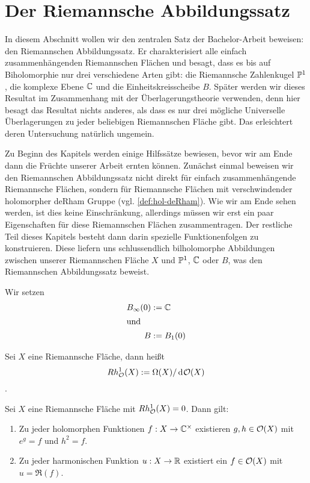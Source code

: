 \section{Der Riemannsche Abbildungssatz}
\label{sec:RMT}

In diesem Abschnitt wollen wir den zentralen Satz der Bachelor-Arbeit
beweisen: den Riemannschen Abbildungssatz. Er charakterisiert alle
einfach zusammenhängenden Riemannschen Flächen und besagt,
dass es bis auf Biholomorphie nur drei verschiedene Arten gibt: die
Riemannsche Zahlenkugel $\P^1$, die komplexe Ebene $\C$
und die Einheitskreisscheibe $B$.
Später werden wir dieses Resultat im Zusammenhang mit der
Überlagerungstheorie verwenden, denn hier besagt das Resultat nichts
anderes, als dass es nur drei mögliche Universelle Überlagerungen zu
jeder beliebigen Riemannschen Fläche gibt. Das erleichtert deren
Untersuchung natürlich ungemein.

Zu Beginn des Kapitels werden einige Hilfssätze bewiesen, bevor wir am
Ende dann die Früchte unserer Arbeit ernten können. Zunächst einmal
beweisen wir den Riemannschen Abbildungssatz nicht
direkt für einfach zusammenhängende Riemannsche Flächen, sondern für
Riemannsche Flächen mit verschwindender holomorpher deRham Gruppe
(vgl. \ref{def:hol-deRham}). Wie wir am Ende sehen werden, ist dies
keine Einschränkung, allerdings müssen wir erst ein paar Eigenschaften
für diese Riemannschen Flächen zusammentragen. Der restliche Teil
dieses Kapitels besteht dann darin spezielle Funktionenfolgen
zu konstruieren. Diese liefern uns schlussendlich bilholomorphe
Abbildungen zwischen unserer Riemannschen Fläche $X$ und $\P^1$, $\C$
oder $B$, was den Riemannschen Abbildungssatz beweist.


\begin{defin}
  Wir setzen
  \begin{align*}
    B_\infty(0) & := \C \\
    \intertext{und}
    B & := B_1(0)
  \end{align*}
\end{defin}



\begin{defin}
  \label{def:hol-deRham}
  Sei $X$ eine Riemannsche Fläche, dann heißt
  \[
  Rh_\hol^1(X) := \Omega(X)/\d[\hol(X)]
  \]
  .
\end{defin}

\begin{lemma}
  \label{lemma:ex-log}
  Sei $X$ eine Riemannsche Fläche mit $Rh^1_\hol(X) = 0$. Dann gilt:
  \begin{enumerate}
  \item Zu jeder holomorphen Funktionen $f: X \ra \C^\times$ existieren
    $g, h \in \hol(X)$ mit $e^g = f$ und $h^2 = f$.
  \item Zu jeder harmonischen Funktion $u: X \ra \R$ existiert ein $f
    \in \hol(X)$ mit $u = \Re(f)$.
  \end{enumerate}
\end{lemma}

